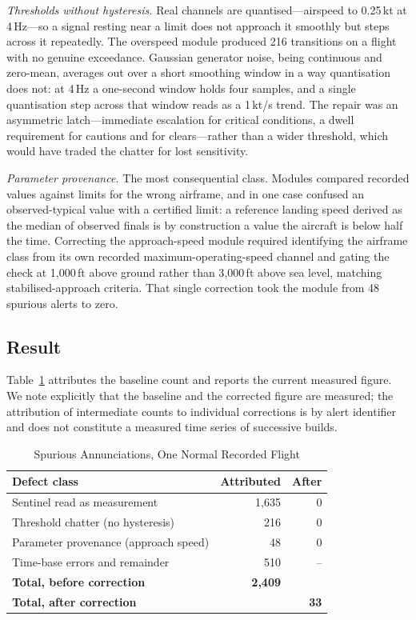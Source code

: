 \documentclass[conference]{IEEEtran}
\begin{document}
\textit{Thresholds without hysteresis.} Real channels are quantised---airspeed
to 0.25\,kt at 4\,Hz---so a signal resting near a limit does not approach it
smoothly but steps across it repeatedly. The overspeed module produced 216
transitions on a flight with no genuine exceedance. Gaussian generator noise,
being continuous and zero-mean, averages out over a short smoothing window in
a way quantisation does not: at 4\,Hz a one-second window holds four samples,
and a single quantisation step across that window reads as a 1\,kt/s trend.
The repair was an asymmetric latch---immediate escalation for critical
conditions, a dwell requirement for cautions and for clears---rather than a
wider threshold, which would have traded the chatter for lost sensitivity.

\textit{Parameter provenance.} The most consequential class. Modules compared
recorded values against limits for the wrong airframe, and in one case
confused an observed-typical value with a certified limit: a reference landing
speed derived as the median of observed finals is by construction a value the
aircraft is below half the time. Correcting the approach-speed module required
identifying the airframe class from its own recorded maximum-operating-speed
channel and gating the check at 1{,}000\,ft above ground rather than 3{,}000\,ft
above sea level, matching stabilised-approach criteria. That single correction
took the module from 48 spurious alerts to zero.

\subsection{Result}

Table~\ref{tab:defects} attributes the baseline count and reports the current
measured figure. We note explicitly that the baseline and the corrected figure
are measured; the attribution of intermediate counts to individual corrections
is by alert identifier and does not constitute a measured time series of
successive builds.

\begin{table}[t]
\caption{Spurious Annunciations, One Normal Recorded Flight}
\label{tab:defects}
\centering
\footnotesize
\begin{tabular}{@{}lrr@{}}
\toprule
\textbf{Defect class} & \textbf{Attributed} & \textbf{After} \\
\midrule
Sentinel read as measurement & 1{,}635 & 0 \\
Threshold chatter (no hysteresis) & 216 & 0 \\
Parameter provenance (approach speed) & 48 & 0 \\
Time-base errors and remainder & 510 & -- \\
\midrule
\textbf{Total, before correction} & \textbf{2{,}409} & \\
\textbf{Total, after correction} & & \textbf{33} \\
\bottomrule
\end{tabular}
\end{table}
\end{document}
